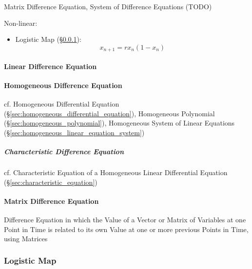 Matrix Difference Equation, System of Difference Equations (TODO)

Non-linear:
\begin{itemize}
  \item Logistic Map (\S\ref{sec:logistic_map}):\[
    x_{n+1} = rx_n(1-x_n)
  \]
\end{itemize}



\paragraph{Linear Difference Equation}\label{sec:linear_difference_equation}
\hfill

\paragraph{Homogeneous Difference Equation}
\label{sec:homogeneous_difference_equation}
\hfill

cf. Homogeneous Differential Equation
(\S\ref{sec:homogeneous_differential_equation}), Homogeneous Polynomial
(\S\ref{sec:homogeneous_polynomial}), Homogeneous System of Linear Equations
(\S\ref{sec:homogeneous_linear_equation_system})



\subparagraph{Characteristic Difference Equation}
\label{sec:characteristic_difference_equation}\hfill

cf. Characteristic Equation of a Homogeneous Linear Differential Equation
(\S\ref{sec:characteristic_equation})



\paragraph{Matrix Difference Equation}\label{sec:matrix_difference_equation}
\hfill

Difference Equation in which the Value of a Vector or Matrix of Variables at
one Point in Time is related to its own Value at one or more previous Points in
Time, using Matrices



\subsubsection{Logistic Map}\label{sec:logistic_map}


